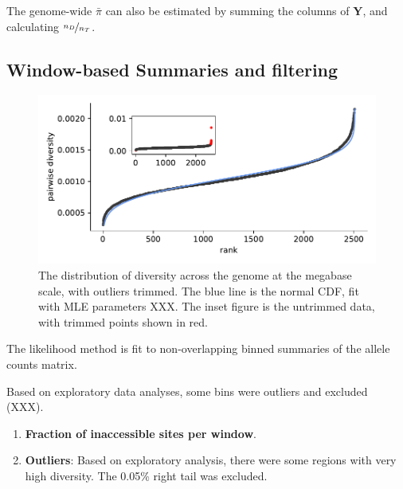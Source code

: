 \documentclass[11pt]{article}
\begin{document}
The genome-wide $\bar{\pi}$ can also be estimated by summing the columns of
$\mathbf{Y}$, and calculating $\nicefrac{n_D}{n_T}$.

\subsection{Window-based Summaries and filtering}

\begin{figure}[!htb]
  \centering
  \includegraphics{figures/supplementary/diversity_trimming_dist.pdf}

  \caption{The distribution of diversity across the genome at the megabase
  scale, with outliers trimmed. The blue line is the normal CDF, fit with MLE
parameters XXX. The inset figure is the untrimmed data, with trimmed points
shown in red.}

  \label{suppfig:trimming}
\end{figure}



The likelihood method is fit to non-overlapping binned summaries of the allele
counts matrix. 


Based on exploratory data analyses, some bins were outliers and
excluded (XXX).

\begin{enumerate}
  \item \textbf{Fraction of inaccessible sites per window}.  

  \item \textbf{Outliers}: Based on exploratory analysis, there were some
    regions with very high diversity. The 0.05\% right tail was excluded.

\end{enumerate}


\end{document}
